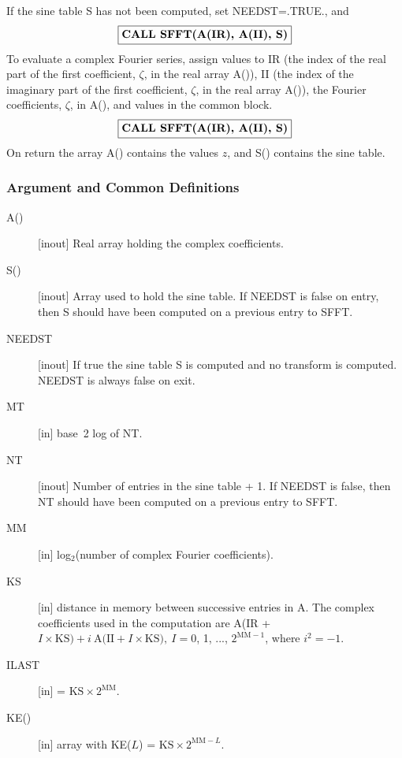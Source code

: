 \documentclass[twoside]{MATH77}
\begin{document}
If the sine table S has not been computed, set NEEDST=.TRUE., and
$$
\fbox{{\bf CALL SFFT(A(IR), A(II), S)}}
$$
To evaluate a complex Fourier series, assign values to IR (the index of
the real part of the first coefficient, $\zeta $, in the real array A()),
II (the index of the imaginary part of the first coefficient, $\zeta $, in
the real array A()), the Fourier coefficients, $\zeta $, in A(), and
values in the common block.
$$
\fbox{{\bf CALL SFFT(A(IR), A(II), S)}}
$$
On return the array A() contains the values $z$, and S() contains the sine
table.

\subsubsection{Argument and Common Definitions}

\begin{description}
\item[A()]  [inout] Real array holding the complex coefficients.

\item[S()]  [inout] Array used to hold the sine table. If NEEDST is false on
entry, then S should have been computed on a previous entry to SFFT.

\item[NEEDST]  [inout] If true the sine table S is computed and no
transform is computed. NEEDST is always false on exit.

\item[MT]  [in] base~2 log of NT.

\item[NT]  [inout] Number of entries in the sine table + 1. If NEEDST is
false, then NT should have been computed on a previous entry to SFFT.

\item[MM]  [in] log$_2$(number of complex Fourier coefficients).

\item[KS]  [in] distance in memory between successive entries in A. The
complex coefficients used in the computation are A(IR + $I\times
\text{KS})+i\ \text{A(II}+I\times \text{KS}),\ I=0$,
1, ..., $2^{\text{MM}-1}$, where $i^2=-1.$

\item[ILAST]  [in] = $\text{KS} \times 2^{\text{MM}}.$

\item[KE()]  [in] array with KE($L$) = $\text{KS} \times 2^{\text{MM}-L}.$
\end{description}
\end{document}
